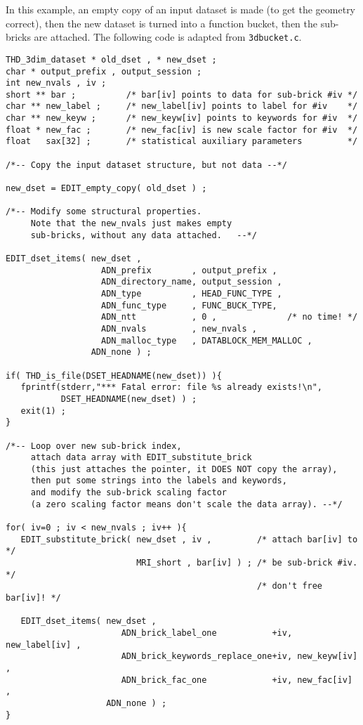 In this example, an empty copy of an input dataset is made
(to get the geometry correct), then the new dataset is turned
into a function bucket, then the sub-bricks are attached.
The following code is adapted from {\tt 3dbucket.c}.
\begin{verbatim}
THD_3dim_dataset * old_dset , * new_dset ;
char * output_prefix , output_session ;
int new_nvals , iv ;
short ** bar ;          /* bar[iv] points to data for sub-brick #iv */
char ** new_label ;     /* new_label[iv] points to label for #iv    */
char ** new_keyw ;      /* new_keyw[iv] points to keywords for #iv  */
float * new_fac ;       /* new_fac[iv] is new scale factor for #iv  */
float   sax[32] ;       /* statistical auxiliary parameters         */

/*-- Copy the input dataset structure, but not data --*/

new_dset = EDIT_empty_copy( old_dset ) ;

/*-- Modify some structural properties.
     Note that the new_nvals just makes empty
     sub-bricks, without any data attached.   --*/

EDIT_dset_items( new_dset ,
                   ADN_prefix        , output_prefix ,
                   ADN_directory_name, output_session ,
                   ADN_type          , HEAD_FUNC_TYPE ,
                   ADN_func_type     , FUNC_BUCK_TYPE,
                   ADN_ntt           , 0 ,              /* no time! */
                   ADN_nvals         , new_nvals ,
                   ADN_malloc_type   , DATABLOCK_MEM_MALLOC ,
                 ADN_none ) ;

if( THD_is_file(DSET_HEADNAME(new_dset)) ){
   fprintf(stderr,"*** Fatal error: file %s already exists!\n",
           DSET_HEADNAME(new_dset) ) ;
   exit(1) ;
}

/*-- Loop over new sub-brick index,
     attach data array with EDIT_substitute_brick
     (this just attaches the pointer, it DOES NOT copy the array),
     then put some strings into the labels and keywords,
     and modify the sub-brick scaling factor
     (a zero scaling factor means don't scale the data array). --*/

for( iv=0 ; iv < new_nvals ; iv++ ){
   EDIT_substitute_brick( new_dset , iv ,         /* attach bar[iv] to   */
                          MRI_short , bar[iv] ) ; /* be sub-brick #iv.   */
                                                  /* don't free bar[iv]! */

   EDIT_dset_items( new_dset ,
                       ADN_brick_label_one           +iv, new_label[iv] ,
                       ADN_brick_keywords_replace_one+iv, new_keyw[iv]  ,
                       ADN_brick_fac_one             +iv, new_fac[iv]   ,
                    ADN_none ) ;
}


\end{verbatim}
